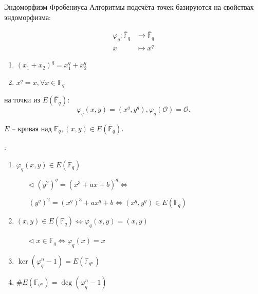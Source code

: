 \documentclass{beamer}
\begin{document}
\begin{frame}{Эндоморфизм Фробениуса}
Алгоритмы подсчёта точек базируются на свойствах эндоморфизма:

\begin{equation*}
    \begin{split}
        \varphi_q: \overline{\mathbb{F}}_q &\rightarrow \overline{\mathbb{F}}_q \\
                 x & \mapsto x^q
    \end{split}
\end{equation*}
\begin{enumerate}
    \item $(x_1 + x_2)^q = x_1^q + x_2^q$
    \item $x^q = x, \forall x \in {\mathbb{F}_q}$
\end{enumerate}

\vspace{0.5em}

 на точки из $E(\overline{\mathbb{F}}_q)$:
\[
\varphi_q(x, y) = (x^q, y^q), \varphi_q(\mathcal{O}) = \mathcal{O}.
\]
\end{frame}

\begin{frame}{}%
$E$ -- кривая над ${\mathbb{F}_q}, (x, y) \in E(\overline{\mathbb{F}}_q)$.
\vspace{1em}

:
\begin{enumerate}
    \item ${\varphi _q}(x,y) \in E( \overline{\mathbb{F}}_q )$
    \begin{itemize}
        \item[$\triangleleft$]
        $(y^2)^q = (x^3 + ax + b)^q \Leftrightarrow$
        \item[] $(y^q)^2 = (x^q)^3 + a x^q + b \Leftrightarrow (x^q, y^q) \in E ( \overline{\mathbb{F}}_q )$
        \structure{$\triangleright$}
    \end{itemize}
    \vspace{0.5em}
    
    \item $(x,y) \in E(\mathbb{F}_q) \Leftrightarrow \varphi_q(x,y) = (x,y)$
        \begin{itemize}
            \item[$\triangleleft$] $x \in \mathbb{F}_q \Leftrightarrow \varphi_q(x) = x$ \structure{$\triangleright$}
        \end{itemize}    
    
    \vspace{0.5em}
    \item $\mathop{\ker}(\varphi^n_q - 1) = E(\mathbb{F}_{q^n})$ \\
     
     \vspace{0.5em}
    \item $\# E( \mathbb{F}_{q^n} ) = \deg ( \varphi_q^n - 1 )$
\end{enumerate}
\end{frame}
\end{document}
